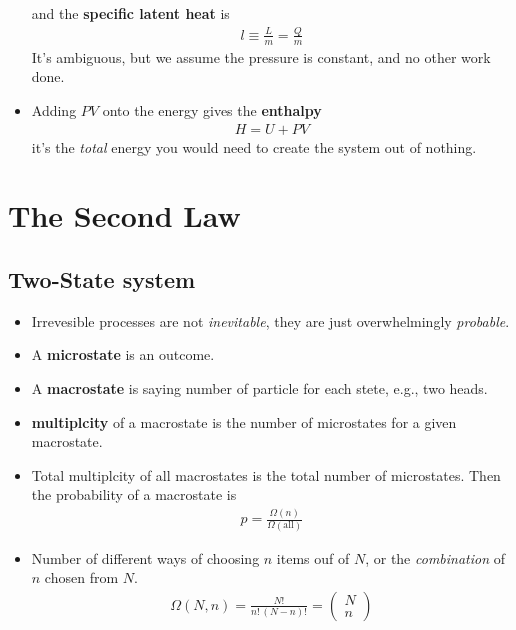 \documentclass{book}
\begin{document}
\begin{itemize}
        and the \textbf{specific latent heat} is
        \begin{align}
          \label{eq:specific latent}
          l \equiv \frac{L}{m}= \frac{Q}{m}
        \end{align}
        It's ambiguous, but we assume the pressure is constant, and no other work done.
  \item Adding $PV$ onto the energy gives the \textbf{enthalpy}
        \begin{align}
          \label{eq:enthalpy}
          H = U + PV
        \end{align}
        it's the \textit{total} energy you would need to create the system out of nothing.



\end{itemize}


\chapter{The Second Law}

\section{Two-State system}%
\label{sec:two state}
\begin{itemize}

    \item Irrevesible processes are not \textit{inevitable}, they are just overwhelmingly \textit{probable}.
    \item A \textbf{microstate} is an outcome.
    \item A \textbf{macrostate} is saying number of particle for each stete, e.g., two heads.
    \item \textbf{multiplcity} of a macrostate is the number of microstates for a given macrostate.
      \item Total multiplcity of all macrostates is the total number of microstates. Then the probability
        of a macrostate is
        \begin{align}
          p = \frac{\Omega(n)}{\Omega(\text{all})}
        \end{align}
        \item Number of different ways of choosing $n$ items ouf of $N$, or the \textit{combination} of $n$
          chosen from $N$.
          \begin{align}
            \label{eq:multiplcity formula}
            \Omega(N, n) = \frac{N!}{n! \, (N-n)!} =
            \begin{pmatrix}
              N \\ n
            \end{pmatrix}
          \end{align}


\end{itemize}
\end{document}
